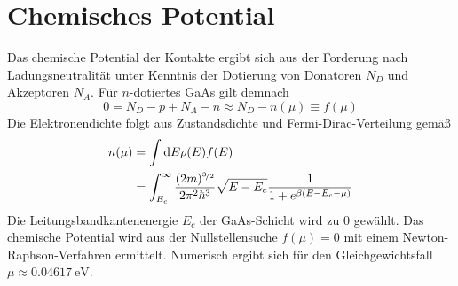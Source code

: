 \section{Chemisches Potential }
\label{sec:A_3}
Das chemische Potential der Kontakte ergibt sich aus der Forderung nach Ladungsneutralität unter Kenntnis der Dotierung von Donatoren $N_D$ und Akzeptoren $N_A$. Für $n$-dotiertes GaAs gilt demnach
\begin{equation*}
  0 = N_D - p + N_A - n \approx N_D - n(\mu) \equiv f(\mu)
\end{equation*}
Die Elektronendichte folgt aus Zustandsdichte und Fermi-Dirac-Verteilung gemäß
\begin{align*}
  n(\mu) &= \int\mathop{}\!\mathrm{d} E \rho(E) f(E) \\
   &= \int_{E_c}^{\infty}\frac{(2m)^{\nicefrac{3}{2}} }{2\pi^2\hbar^3}\sqrt{E-E_c} \frac{1}{1+e^{\beta(E-E_c-\mu)}}
\end{align*}
Die Leitungsbandkantenenergie $E_c$ der GaAs-Schicht wird zu 0 gewählt. Das chemische Potential wird aus der Nullstellensuche $f(\mu)=0$ mit einem Newton-Raphson-Verfahren ermittelt. Numerisch ergibt sich für den Gleichgewichtsfall  $\mu\approx\SI{0.04617}{\electronvolt}$.

